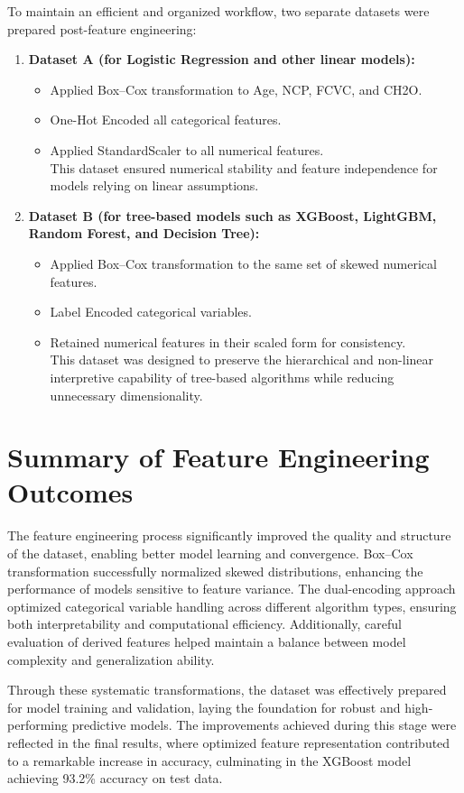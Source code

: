 To maintain an efficient and organized workflow, two separate datasets were prepared post-feature engineering:

\begin{enumerate}
    \item \textbf{Dataset A (for Logistic Regression and other linear models):}
    \begin{itemize}
        \item Applied Box–Cox transformation to Age, NCP, FCVC, and CH2O.
        \item One-Hot Encoded all categorical features.
        \item Applied StandardScaler to all numerical features. \\ This dataset ensured numerical stability and feature independence for models relying on linear assumptions.
    \end{itemize}

    \item \textbf{Dataset B (for tree-based models such as XGBoost, LightGBM, Random Forest, and Decision Tree):}
    \begin{itemize}
        \item Applied Box–Cox transformation to the same set of skewed numerical features.
        \item Label Encoded categorical variables.
        \item Retained numerical features in their scaled form for consistency. \\ This dataset was designed to preserve the hierarchical and non-linear interpretive capability of tree-based algorithms while reducing unnecessary dimensionality.
    \end{itemize}
\end{enumerate}



\section{Summary of Feature Engineering Outcomes}\label{sec:summary-of-feature-engineering-outcomes}

The feature engineering process significantly improved the quality and structure of the dataset, enabling better model learning and convergence.
Box–Cox transformation successfully normalized skewed distributions, enhancing the performance of models sensitive to feature variance.
The dual-encoding approach optimized categorical variable handling across different algorithm types, ensuring both interpretability and computational efficiency.
Additionally, careful evaluation of derived features helped maintain a balance between model complexity and generalization ability.

Through these systematic transformations, the dataset was effectively prepared for model training and validation, laying the foundation for robust and high-performing predictive models.
The improvements achieved during this stage were reflected in the final results, where optimized feature representation contributed to a remarkable increase in accuracy, culminating in the XGBoost model achieving 93.2\% accuracy on test data.
